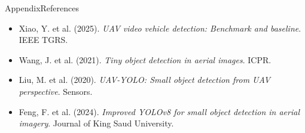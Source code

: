 \documentclass[10pt]{beamer}
\begin{document}

    
	

	
	\begin{frame}{Appendix}{References}
		
		\footnotesize
		
		\begin{itemize}
			
			\item Xiao, Y. et al. (2025). \textit{UAV video vehicle detection: Benchmark and baseline}. IEEE TGRS.
			
			\item Wang, J. et al. (2021). \textit{Tiny object detection in aerial images}. ICPR.
			
			\item Liu, M. et al. (2020). \textit{UAV-YOLO: Small object detection from UAV perspective}. Sensors.
			
			\item Feng, F. et al. (2024). \textit{Improved YOLOv8 for small object detection in aerial imagery}. Journal of King Saud University.
			
		\end{itemize}
		
	\end{frame}




    
	
	
\end{document}
